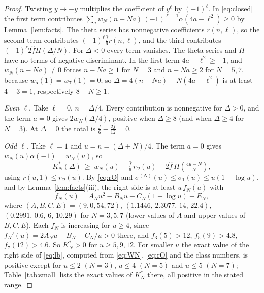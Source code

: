 \documentclass[mathematics,article,submit,pdftex,oneauthor]{Definitions/mdpi}
\numberwithin{equation}{section}
\theoremstyle{plain}
\theoremstyle{remark}
\newcommand{\cO}{\mathcal{O}}
\begin{document}
\begin{proof}
Twisting $y\mapsto-y$ multiplies the coefficient of $y^\ell$ by $(-1)^\ell$. In \eqref{eq:closed} the first term contributes $\sum_aw_N(n-Na)\,(-1)^{\ell+1}\alpha(4a-\ell^2)\ge0$ by Lemma~\ref{lem:facts}. The theta series has nonnegative coefficients $r(n,\ell)$, so the second term contributes $(-1)^\ell\tfrac{\hat f}6r(n,\ell)$, and the third contributes $(-1)^\ell2\hat fH(\Delta/N)$. For $\Delta<0$ every term vanishes. The theta series and $H$ have no terms of negative discriminant. In the first term $4a-\ell^2\ge-1$, and $w_N(n-Na)\ne0$ forces $n-Na\ge1$ for $N=3$ and $n-Na\ge2$ for $N=5,7$, because $w_5(1)=w_7(1)=0$; so $\Delta=4(n-Na)+N(4a-\ell^2)$ is at least $4-3=1$, respectively $8-N\ge1$.

\emph{Even $\ell$.} Take $\ell=0$, $n=\Delta/4$. Every contribution is nonnegative for $\Delta>0$, and the term $a=0$ gives $2w_N(\Delta/4)$, positive when $\Delta\ge8$ (and when $\Delta\ge4$ for $N=3$). At $\Delta=0$ the total is $\tfrac{\hat f}{6}-\tfrac{2\hat f}{12}=0$.

\emph{Odd $\ell$.} Take $\ell=1$ and $u=n=(\Delta+N)/4$. The term $a=0$ gives $w_N(u)\alpha(-1)=w_N(u)$, so
\begin{equation}\label{eq:lb}
K^*_N(\Delta)\ \ge\ w_N(u)-\tfrac{\hat f}6\,r_{\cO}(u)-2\hat f\,H\!\left(\tfrac{4u-N}{N}\right),
\end{equation}
using $r(u,1)\le r_\cO(u)$. By \eqref{eq:rO} and $\sigma^{(N)}(u)\le\sigma_1(u)\le u(1+\log u)$, and by Lemma~\ref{lem:facts}(iii), the right side is at least $u\,f_N(u)$ with
\[
f_N(u)=A_Nu^2-B_Nu-C_N(1+\log u)-E_N,
\]
where $(A,B,C,E)=(9,0,54,72)$, $(1.1446,\,2.3077,\,14,\,22.4)$, $(0.2991,\,0.6,\,6,\,10.29)$ for $N=3,5,7$ (lower values of $A$ and upper values of $B,C,E$). Each $f_N$ is increasing for $u\ge4$, since $f_N'(u)=2A_Nu-B_N-C_N/u>0$ there, and $f_3(5)>12$, $f_5(9)>4.8$, $f_7(12)>4.6$. So $K^*_N>0$ for $u\ge5,9,12$. For smaller $u$ the exact value of the right side of \eqref{eq:lb}, computed from \eqref{eq:WN}, \eqref{eq:rO} and the class numbers, is positive except for $u\le2$ $(N=3)$, $u\le4$ $(N=5)$ and $u\le5$ $(N=7)$; Table~\ref{tab:small} lists the exact values of $K^*_N$ there, all positive in the stated range.
\end{proof}
\end{document}
